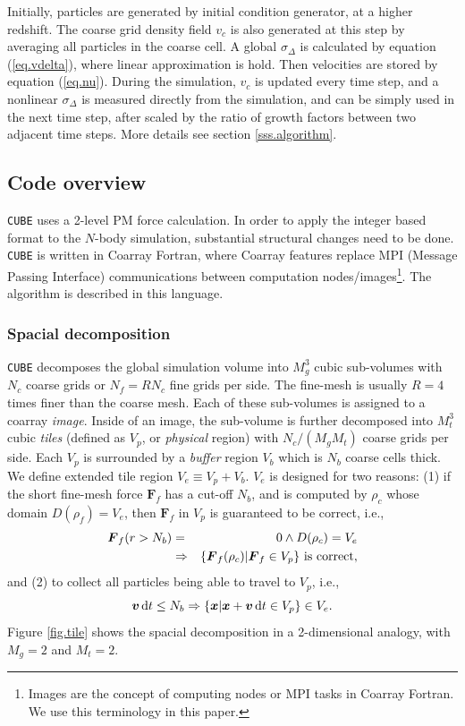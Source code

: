 \documentclass[10pt,twocolumn,preprint]{emulateapj}
\newcommand{\bs}{\boldsymbol}
\begin{document}
Initially, particles are generated by initial condition generator, at a higher redshift. The coarse grid density field $v_c$ is also generated at this step by averaging all particles in the coarse cell. A global $\sigma_\Delta$ is calculated by equation (\ref{eq.vdelta}), where linear approximation is hold. Then velocities are stored by equation (\ref{eq.nu}). During the simulation, $v_c$ is updated every time step, and a nonlinear $\sigma_\Delta$ is measured directly from the simulation, and can be simply used in the next time step, after scaled by the ratio of growth factors between two adjacent time steps. More details see section \ref{sss.algorithm}.

\subsection{Code overview}\label{ss.overview}
{\tt CUBE} uses a 2-level PM force calculation. In order to apply the integer based format to the $N$-body simulation, substantial structural changes need to be done. {\tt CUBE} is written in Coarray Fortran, where Coarray features replace MPI (Message Passing Interface) communications between computation nodes/images\footnote{Images are the concept of computing nodes or MPI tasks in Coarray Fortran. We use this terminology in this paper.}. The algorithm is described in this language. 

\subsubsection{Spacial decomposition}\label{sss.spatial_decomposition}
{\tt CUBE} decomposes the global simulation volume into $M_g^3$ cubic sub-volumes with $N_c$ coarse grids or $N_f=RN_c$ fine grids per side. The fine-mesh is usually $R=4$ times finer than the coarse mesh. Each of these sub-volumes is assigned to a coarray {\it image}. Inside of an image, the sub-volume is further decomposed into $M_t^3$ cubic {\it tiles} (defined as $V_p$, or {\it physical} region) with $N_c/(M_g M_t)$ coarse grids per side. Each $V_p$ is surrounded by a {\it buffer} region $V_b$ which is $N_b$ coarse cells thick. We define extended tile region $V_e\equiv V_p+V_b$. $V_e$ is designed for two reasons: (1) if the short fine-mesh force ${\bs F}_f$ has a cut-off $N_b$, and is computed by $\rho_c$ whose domain $D(\rho_f)=V_e$, then ${\bs F}_f$ in $V_p$ is guaranteed to be correct, i.e.,
\begin{eqnarray}\label{eq.cond1}
\nonumber	{\bs F}_f(r>N_b)&=&0 \wedge D(\rho_c)=V_e\\
	&\Rightarrow& \{{\bs F}_f(\rho_c) |{\bs F}_f\in V_p \} {\rm \ is\ correct},
\end{eqnarray}
and (2) to collect all particles being able to travel to $V_p$, i.e.,
\begin{equation}\label{eq.cond2}
	{\bs v}\,{\rm d}t \leq N_b \Rightarrow \{ {\bs x} | {\bs x}+{\bs v}\,{\rm d}t\in V_p\} \in V_e.
\end{equation}
Figure \ref{fig.tile} shows the spacial decomposition in a 2-dimensional analogy, with $M_g=2$ and $M_t=2$. 
\end{document}
